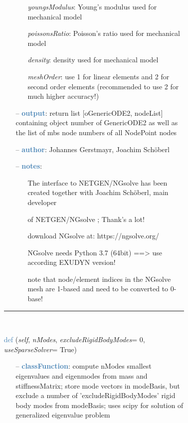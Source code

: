 \begin{itemize}[leftmargin=1.4cm]
\begin{itemize}[leftmargin=1.4cm]
\begin{itemize}[leftmargin=0.5cm]
\begin{itemize}[leftmargin=1.4cm]
\begin{itemize}[leftmargin=1.4cm]
\begin{itemize}[leftmargin=0.5cm]
\begin{itemize}[leftmargin=0.7cm]
\begin{itemize}[leftmargin=1.2cm]
\item[]{\it youngsModulus}: Young's modulus used for mechanical model
\item[]{\it poissonsRatio}: Poisson's ratio used for mechanical model
\item[]{\it density}: density used for mechanical model
\item[]{\it meshOrder}: use 1 for linear elements and 2 for second order elements (recommended to use 2 for much higher accuracy!)
\end{itemize}
\item[--]\textcolor{steelblue}{\bf output}: return list [oGenericODE2, nodeList] containing object number of GenericODE2 as well as the list of mbs node numbers of all NodePoint nodes
\item[--]\textcolor{steelblue}{\bf author}: Johannes Gerstmayr, Joachim Sch\"oberl
\item[--]\textcolor{steelblue}{\bf notes}: \vspace{-6pt}
\begin{itemize}[leftmargin=1.2cm]
\setlength{\itemindent}{-0.7cm}
\item[]The interface to NETGEN/NGsolve has been created together with Joachim Sch\"oberl, main developer
\item[]of NETGEN/NGsolve \cite{Schoeberl1997,NGsolve2014}; Thank's a lot!
\item[]download NGsolve at: https://ngsolve.org/
\item[]NGsolve needs Python 3.7 (64bit) ==> use according EXUDYN version!
\item[]note that node/element indices in the NGsolve mesh are 1-based and need to be converted to 0-base!
\end{itemize}
\vspace{12pt}\end{itemize}
%
\noindent\rule{8cm}{0.75pt}\vspace{1pt} \\ 
\begin{flushleft}
\noindent \textcolor{steelblue}{def {\bf {}}}\label{sec:FEM:FEMinterface:ComputeEigenmodes}
({\it self}, {\it nModes}, {\it excludeRigidBodyModes}= 0, {\it useSparseSolver}= True)
\end{flushleft}
\setlength{\itemindent}{0.7cm}
\begin{itemize}[leftmargin=0.7cm]
\item[--]\textcolor{steelblue}{\bf classFunction}: compute nModes smallest eigenvalues and eigenmodes from mass and stiffnessMatrix; store mode vectors in modeBasis, but exclude a number of 'excludeRigidBodyModes' rigid body modes from modeBasis; uses scipy for solution of generalized eigenvalue problem

\end{itemize}
\end{itemize}
\end{itemize}
\end{itemize}
\end{itemize}
\end{itemize}
\end{itemize}
